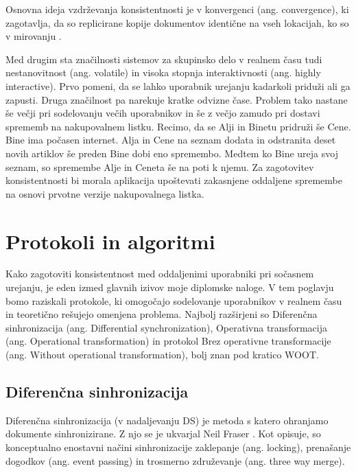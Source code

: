 \documentclass[a4paper, 12pt, twoside]{book}
\begin{document}
Osnovna ideja vzdrževanja konsistentnosti je v konvergenci (ang. convergence), ki zagotavlja, da so replicirane kopije dokumentov identične na vseh lokacijah, ko so v mirovanju \cite{wiki}.

Med drugim sta značilnosti sistemov za skupinsko delo v realnem času \cite{ccigs} tudi nestanovitnost (ang. volatile) in visoka stopnja interaktivnosti (ang. highly interactive). Prvo pomeni, da se lahko uporabnik urejanju kadarkoli priduži ali ga zapusti. Druga značilnost pa narekuje kratke odvizne čase. Problem tako nastane še večji pri sodelovanju večih uporabnikov in še z večjo zamudo pri dostavi sprememb na nakupovalnem listku. Recimo, da se Alji in Binetu pridruži še Cene. Bine ima počasen internet. Alja in Cene na seznam dodata in odstranita deset novih artiklov še preden Bine dobi eno spremembo. Medtem ko Bine ureja svoj seznam, so spremembe Alje in Ceneta še na poti k njemu. Za zagotovitev konsistentnosti bi morala aplikacija upoštevati zakasnjene oddaljene spremembe na osnovi prvotne verzije nakupovalnega listka.

\chapter{Protokoli in algoritmi}

Kako zagotoviti konsistentnost med oddaljenimi uporabniki pri sočasnem urejanju, je eden izmed glavnih izivov moje diplomske naloge. V tem poglavju bomo raziskali protokole, ki omogočajo sodelovanje uporabnikov v realnem času in teoretično rešujejo omenjena problema. Najbolj razširjeni so Diferenčna sinhronizacija (ang. Differential synchronization), Operativna transformacija (ang. Operational transformation) in protokol Brez operativne transformacije (ang. Without operational transformation), bolj znan pod kratico WOOT.

\section{Diferenčna sinhronizacija}
\label{sec:ds}

Diferenčna sinhronizacija (v nadaljevanju DS) je metoda s katero ohranjamo dokumente sinhronizirane. Z njo se je ukvarjal Neil Fraser \cite{diffsync}. Kot opisuje, so konceptualno enostavni načini sinhronizacije zaklepanje (ang. locking), prenašanje dogodkov (ang. event passing) in trosmerno združevanje (ang. three way merge).
\end{document}
